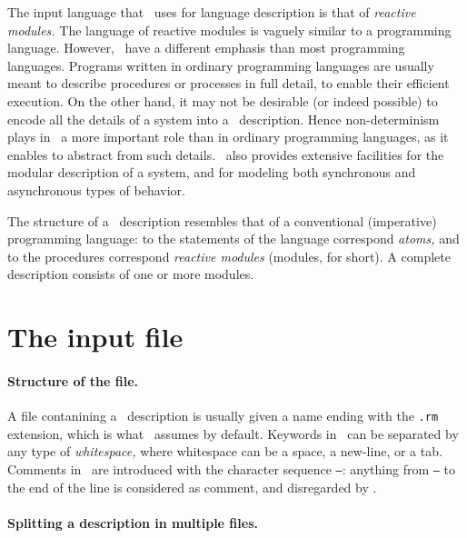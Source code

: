 \label{chap:rem}

The input language that \mocha\  uses for language description is that
of {\em reactive modules.}  The language of reactive modules is
vaguely similar to a programming language.  However, \rem\ have a
different emphasis than most programming languages.  Programs written
in ordinary programming languages are usually meant to describe
procedures or processes in full detail, to enable their efficient
execution. On the other hand, it may not be desirable (or indeed
possible) to encode all the details of a system into a \rem\
description.  Hence non-determinism plays in \rem\ a more important
role than in ordinary programming languages, as it enables to abstract
from such details. \rem\ also provides extensive facilities for
the modular description of a system, and for modeling both synchronous
and asynchronous types of behavior. 

The structure of a \rem\ description resembles that of a conventional
(imperative) programming language: to the statements of the language
correspond {\em atoms,} and to the procedures correspond {\em reactive
modules\/} (modules, for short).  A complete description consists of
one or more modules.  




\section{The input file}

\paragraph{Structure of the file.}

A file contanining a \rem\ description is usually given a name ending
with the {\tt .rm} extension, which is what \mocha\  assumes by default.
Keywords in \rem\ can be separated by any type of {\em
whitespace,} where whitespace can be a space, a
new-line, or a tab.  Comments\index{comments} in \rem\ are introduced
with the character sequence {\tt --}: anything from {\tt --} to the
end of the line is considered as comment, and disregarded by \mocha.

\paragraph{Splitting a description in multiple files.}

